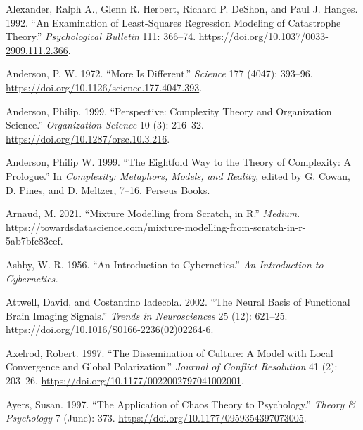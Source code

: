 \documentclass[
  letterpaper,
]{scrbook}
\newlength{\cslhangindent}
\newlength{\cslentryspacingunit} %
\newenvironment{CSLReferences}[2] %
 {%
  \setlength{\parindent}{0pt}
  \ifodd #1
  \let\oldpar\par
  \def\par{\hangindent=\cslhangindent\oldpar}
  \fi
  \setlength{\parskip}{#2\cslentryspacingunit}
 }%
 {}
\begin{document}
\begin{CSLReferences}{1}{0}
\leavevmode{}%
Alexander, Ralph A., Glenn R. Herbert, Richard P. DeShon, and Paul J.
Hanges. 1992. {``An Examination of Least-Squares Regression Modeling of
Catastrophe Theory.''} \emph{Psychological Bulletin} 111: 366--74.
\url{https://doi.org/10.1037/0033-2909.111.2.366}.

\leavevmode{}%
Anderson, P. W. 1972. {``More {Is Different}.''} \emph{Science} 177
(4047): 393--96. \url{https://doi.org/10.1126/science.177.4047.393}.

\leavevmode{}%
Anderson, Philip. 1999. {``Perspective: {Complexity Theory} and
{Organization Science}.''} \emph{Organization Science} 10 (3): 216--32.
\url{https://doi.org/10.1287/orsc.10.3.216}.

\leavevmode{}%
Anderson, Philip W. 1999. {``The {Eightfold Way} to the {Theory} of
{Complexity}: {A Prologue}.''} In \emph{Complexity: Metaphors, Models,
and Reality}, edited by G. Cowan, D. Pines, and D. Meltzer, 7--16.
{Perseus Books}.

\leavevmode{}%
Arnaud, M. 2021. {``Mixture Modelling from Scratch, in {R}.''}
\emph{Medium}.
https://towardsdatascience.com/mixture-modelling-from-scratch-in-r-5ab7bfc83eef.

\leavevmode{}%
Ashby, W. R. 1956. {``An Introduction to Cybernetics.''} \emph{An
Introduction to Cybernetics.}

\leavevmode{}%
Attwell, David, and Costantino Iadecola. 2002. {``The Neural Basis of
Functional Brain Imaging Signals.''} \emph{Trends in Neurosciences} 25
(12): 621--25. \url{https://doi.org/10.1016/S0166-2236(02)02264-6}.

\leavevmode{}%
Axelrod, Robert. 1997. {``The {Dissemination} of {Culture}: {A Model}
with {Local Convergence} and {Global Polarization}.''} \emph{Journal of
Conflict Resolution} 41 (2): 203--26.
\url{https://doi.org/10.1177/0022002797041002001}.

\leavevmode{}%
Ayers, Susan. 1997. {``The {Application} of {Chaos Theory} to
{Psychology}.''} \emph{Theory \& Psychology} 7 (June): 373.
\url{https://doi.org/10.1177/0959354397073005}.


\end{CSLReferences}
\end{document}
